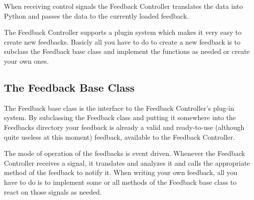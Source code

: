 When receiving control signals the Feedback Controller translates the data into Python and passes the data to the currently loaded feedback.

The Feedback Controller supports a plugin system which makes it very easy to create new feedbacks. Basicly all you have to do to create a new feedback is to subclass the Feedback base class and implement the functions as needed or create your own ones.

\subsection{The Feedback Base Class}
The Feedback base class is the interface to the Feedback Controller's plug-in system. By subclassing the Feedback class and putting it somewhere into the Feedbacks directory your feedback is already a valid and ready-to-use (although quite useless at this moment) feedback, available to the Feedback Controller.

The mode of operation of the feedbacks is event driven. Whenever the Feedback Controller receives a signal, it translates and analyzes it and calls the appropriate method of the feedback to notify it. When writing your own feedback, all you have to do is to implement some or all methods of the Feedback base class to react on those signals as needed.

